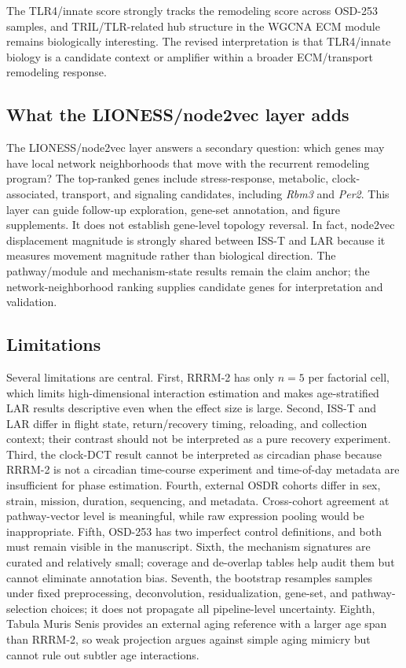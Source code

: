 \documentclass[11pt]{article}
\newcommand{\gene}[1]{\textit{#1}}
\begin{document}
The TLR4/innate score strongly tracks the remodeling score across OSD-253 samples, and TRIL/TLR-related hub structure in the WGCNA ECM module remains biologically interesting. The revised interpretation is that TLR4/innate biology is a candidate context or amplifier within a broader ECM/transport remodeling response.

\subsection{What the LIONESS/node2vec layer adds}

The LIONESS/node2vec layer answers a secondary question: which genes may have local network neighborhoods that move with the recurrent remodeling program? The top-ranked genes include stress-response, metabolic, clock-associated, transport, and signaling candidates, including \gene{Rbm3} and \gene{Per2}. This layer can guide follow-up exploration, gene-set annotation, and figure supplements. It does not establish gene-level topology reversal. In fact, node2vec displacement magnitude is strongly shared between ISS-T and LAR because it measures movement magnitude rather than biological direction. The pathway/module and mechanism-state results remain the claim anchor; the network-neighborhood ranking supplies candidate genes for interpretation and validation.

\subsection{Limitations}

Several limitations are central. First, RRRM-2 has only $n=5$ per factorial cell, which limits high-dimensional interaction estimation and makes age-stratified LAR results descriptive even when the effect size is large. Second, ISS-T and LAR differ in flight state, return/recovery timing, reloading, and collection context; their contrast should not be interpreted as a pure recovery experiment. Third, the clock-DCT result cannot be interpreted as circadian phase because RRRM-2 is not a circadian time-course experiment and time-of-day metadata are insufficient for phase estimation. Fourth, external OSDR cohorts differ in sex, strain, mission, duration, sequencing, and metadata. Cross-cohort agreement at pathway-vector level is meaningful, while raw expression pooling would be inappropriate. Fifth, OSD-253 has two imperfect control definitions, and both must remain visible in the manuscript. Sixth, the mechanism signatures are curated and relatively small; coverage and de-overlap tables help audit them but cannot eliminate annotation bias. Seventh, the bootstrap resamples samples under fixed preprocessing, deconvolution, residualization, gene-set, and pathway-selection choices; it does not propagate all pipeline-level uncertainty. Eighth, Tabula Muris Senis provides an external aging reference with a larger age span than RRRM-2, so weak projection argues against simple aging mimicry but cannot rule out subtler age interactions.
\end{document}
